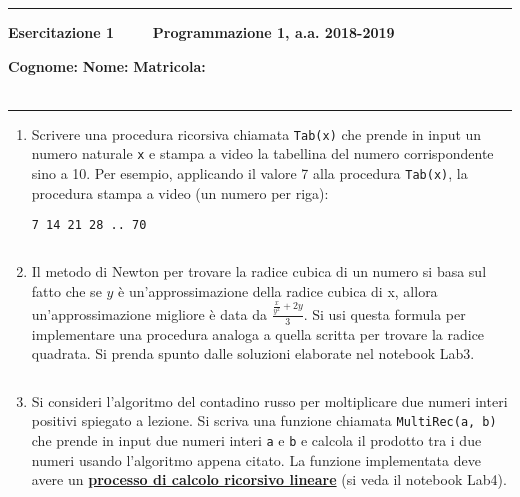 \documentclass[11pt,a4]{article}
\newcommand{\mybox}[2]{$\quad$\fbox{
\begin{minipage}{#1cm}
\hfill\vspace{#2cm}
\end{minipage}
}}
\begin{document}
\thispagestyle{empty}
\hrule
\begin{center}
   {\Large {\bf Esercitazione 1 \hspace{3cm} $\quad \quad$ Programmazione 1, a.a. 2018-2019}}
\end{center}
{\bf Cognome: }\hspace{2.5cm} {\bf Nome: } \hspace{2.5cm} {\bf Matricola: } \\\
\hrule

\begin{enumerate}
\section*{}

\item Scrivere una procedura ricorsiva chiamata {\tt Tab(x)} che prende in input un numero naturale {\tt x} e stampa a video
la tabellina del numero corrispondente sino a 10. Per esempio, applicando il valore 7 alla procedura {\tt Tab(x)}, 
la procedura stampa a video (un numero per riga):
\begin{verbatim}
7 14 21 28 .. 70
\end{verbatim}

\mybox{15}{3.5}

 
\item Il metodo di Newton per trovare la radice cubica di un numero si basa sul fatto che se
$y$ è un'approssimazione della radice cubica di x, allora un'approssimazione migliore è data
da $\frac{\frac{x}{y^2} + 2y}{3}$.
Si usi questa formula per implementare una procedura analoga a quella scritta per trovare
la radice quadrata. Si prenda spunto dalle soluzioni elaborate nel notebook Lab3.

\mybox{15}{4.5}


\item Si consideri l'algoritmo del contadino russo per moltiplicare due numeri interi positivi spiegato a lezione.
Si scriva una funzione chiamata {\tt MultiRec(a, b)} che prende in input due numeri interi {\tt a} e {\tt b}
e calcola il prodotto tra i due numeri usando l'algoritmo appena citato.
La funzione implementata deve avere un {\underline {\bf processo di calcolo ricorsivo lineare}} (si veda il notebook Lab4).


\end{enumerate}
\end{document}

